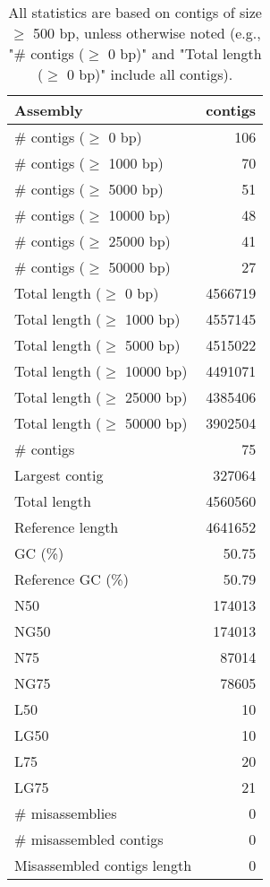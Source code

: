 \documentclass[12pt,a4paper]{article}
\begin{document}
\begin{table}[ht]
\begin{center}
\caption{All statistics are based on contigs of size $\geq$ 500 bp, unless otherwise noted (e.g., "\# contigs ($\geq$ 0 bp)" and "Total length ($\geq$ 0 bp)" include all contigs).}
\begin{tabular}{|l*{1}{|r}|}
\hline
Assembly & contigs \\ \hline
\# contigs ($\geq$ 0 bp) & 106 \\ \hline
\# contigs ($\geq$ 1000 bp) & 70 \\ \hline
\# contigs ($\geq$ 5000 bp) & 51 \\ \hline
\# contigs ($\geq$ 10000 bp) & 48 \\ \hline
\# contigs ($\geq$ 25000 bp) & 41 \\ \hline
\# contigs ($\geq$ 50000 bp) & 27 \\ \hline
Total length ($\geq$ 0 bp) & 4566719 \\ \hline
Total length ($\geq$ 1000 bp) & 4557145 \\ \hline
Total length ($\geq$ 5000 bp) & 4515022 \\ \hline
Total length ($\geq$ 10000 bp) & 4491071 \\ \hline
Total length ($\geq$ 25000 bp) & 4385406 \\ \hline
Total length ($\geq$ 50000 bp) & 3902504 \\ \hline
\# contigs & 75 \\ \hline
Largest contig & 327064 \\ \hline
Total length & 4560560 \\ \hline
Reference length & 4641652 \\ \hline
GC (\%) & 50.75 \\ \hline
Reference GC (\%) & 50.79 \\ \hline
N50 & 174013 \\ \hline
NG50 & 174013 \\ \hline
N75 & 87014 \\ \hline
NG75 & 78605 \\ \hline
L50 & 10 \\ \hline
LG50 & 10 \\ \hline
L75 & 20 \\ \hline
LG75 & 21 \\ \hline
\# misassemblies & 0 \\ \hline
\# misassembled contigs & 0 \\ \hline
Misassembled contigs length & 0 \\ \hline

\end{tabular}
\end{center}
\end{table}
\end{document}
